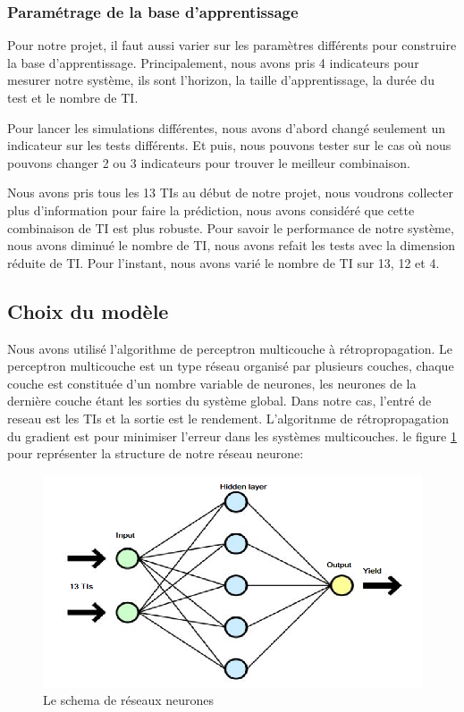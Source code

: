 \subsubsection{Paramétrage de la base d'apprentissage}

Pour notre projet, il faut aussi varier sur les paramètres différents pour construire la base d'apprentissage. Principalement, nous avons pris 4 indicateurs pour mesurer notre système, ils sont l'horizon, la taille d'apprentissage, la durée du test et le nombre de TI.

Pour lancer les simulations différentes, nous avons d'abord changé seulement un indicateur sur les tests différents. Et puis, nous pouvons tester sur le cas où nous pouvons changer 2 ou 3 indicateurs pour trouver le meilleur combinaison. 

Nous avons pris tous les 13 TIs au début de notre projet, nous voudrons collecter plus d’information pour faire la prédiction, nous avons considéré que cette combinaison de TI est plus robuste. Pour savoir le performance de notre système, nous avons diminué le nombre de TI, nous avons refait les tests avec la dimension réduite de TI. Pour l'instant, nous avons varié le nombre de TI sur 13, 12 et 4.

   	
\subsection{Choix du modèle}

Nous avons utilisé l'algorithme de perceptron multicouche à rétropropagation. Le perceptron multicouche est un type réseau organisé par plusieurs couches, chaque couche est constituée d'un nombre variable de neurones, les neurones de la dernière couche étant les sorties du système global. Dans notre cas, l'entré de reseau est les TIs et la sortie est le rendement. L'algoritnme de rétropropagation du gradient est pour minimiser l'erreur dans les systèmes multicouches. le figure \ref{fig:RN} pour représenter la structure de notre réseau neurone:

\begin{figure}
\centering
\includegraphics[width=.9\linewidth, scale=0.2]
{plot/RN.png}
\caption{Le schema de réseaux neurones}
\label{fig:RN}
\end{figure}

